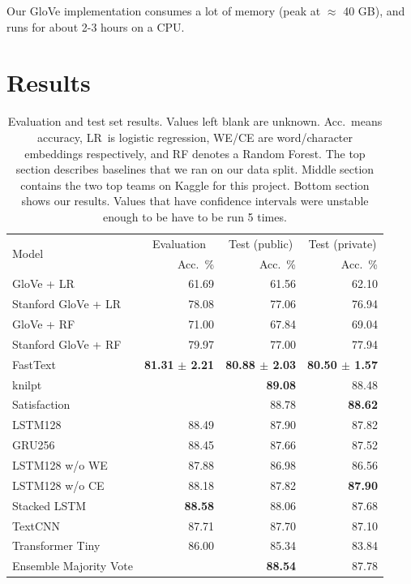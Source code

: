 \documentclass[10pt,conference,compsocconf]{IEEEtran}
\begin{document}
Our GloVe implementation consumes a lot of memory (peak at $\approx$ 40 GB), and runs for about 2-3 hours on a CPU.
  
\section{Results}

\begin{table}\centering
\begin{tabular}{lrrr}
\toprule
\multirow{2}{*}{Model} & \multicolumn{1}{c}{Evaluation} & \multicolumn{1}{c}{Test (public)} & \multicolumn{1}{c}{Test (private)}\\
& Acc.~\% & Acc.~\% & Acc.~\%\\
\midrule
GloVe + LR & 61.69 & 61.56 & 62.10\\
Stanford GloVe + LR & 78.08 & 77.06 & 76.94\\
GloVe + RF & 71.00 & 67.84 & 69.04\\
Stanford GloVe + RF & 79.97 & 77.00 & 77.94\\
FastText \cite{joulin2017bag} & \textbf{81.31} \textbf{$\pm$ 2.21} & \textbf{80.88 $\pm$ 2.03}& \textbf{80.50 $\pm$ 1.57}\\
\midrule
knilpt &  & \textbf{89.08} & 88.48\\
Satisfaction &  & 88.78 & \textbf{88.62}\\
\midrule
LSTM128 & 88.49 & 87.90 & 87.82\\
GRU256 & 88.45 & 87.66 & 87.52\\
LSTM128 w/o WE & 87.88 & 86.98 & 86.56\\
LSTM128 w/o CE & 88.18 & 87.82 & \textbf{87.90}\\
Stacked LSTM & \textbf{88.58} & 88.06 & 87.68\\
TextCNN & 87.71 & 87.70 & 87.10\\
Transformer Tiny & 86.00 & 85.34 & 83.84\\
Ensemble Majority Vote & & \textbf{88.54} & 87.78\\
\bottomrule
\end{tabular}
\caption{Evaluation and test set results. Values left blank are unknown. Acc.~means accuracy, LR~is logistic regression, WE/CE are word/character embeddings respectively, and RF denotes a Random Forest. The top section describes baselines that we ran on our data split. Middle section contains the two top teams on Kaggle for this project. Bottom section shows our results. Values that have confidence intervals were unstable enough to be have to be run 5 times.}\label{tab:results}
\end{table}
\end{document}
